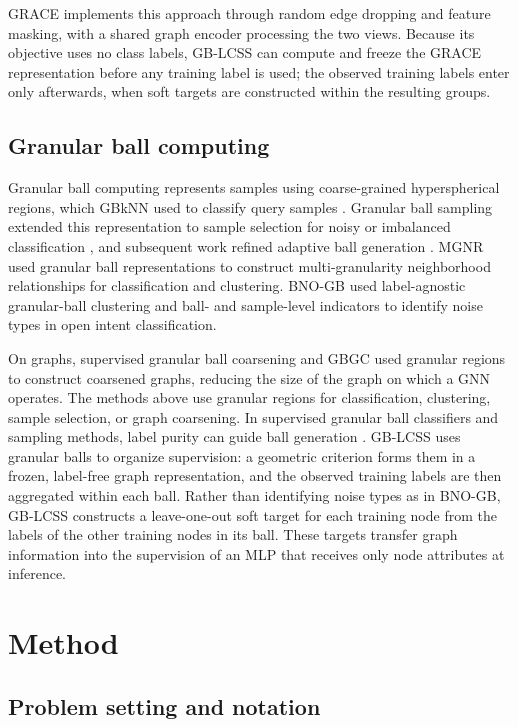 \documentclass[times,review,10pt]{elsarticle}
\theoremstyle{definition}
\theoremstyle{plain}
\begin{document}
GRACE \cite{ref12} implements this approach through random edge dropping and feature masking, with a shared graph encoder processing the two views. Because its objective uses no class labels, GB-LCSS can compute and freeze the GRACE representation before any training label is used; the observed training labels enter only afterwards, when soft targets are constructed within the resulting groups.

\subsection{Granular ball computing}\label{sec:2.5}

Granular ball computing represents samples using coarse-grained hyperspherical regions, which GBkNN used to classify query samples \cite{ref13}. Granular ball sampling extended this representation to sample selection for noisy or imbalanced classification \cite{ref15}, and subsequent work refined adaptive ball generation \cite{ref16}. MGNR \cite{ref58} used granular ball representations to construct multi-granularity neighborhood relationships for classification and clustering. BNO-GB \cite{pr2026bnogb} used label-agnostic granular-ball clustering and ball- and sample-level indicators to identify noise types in open intent classification.

On graphs, supervised granular ball coarsening \cite{ref66} and GBGC \cite{ref67} used granular regions to construct coarsened graphs, reducing the size of the graph on which a GNN operates. The methods above use granular regions for classification, clustering, sample selection, or graph coarsening. In supervised granular ball classifiers and sampling methods, label purity can guide ball generation \cite{ref13,ref15,ref16}. GB-LCSS uses granular balls to organize supervision: a geometric criterion forms them in a frozen, label-free graph representation, and the observed training labels are then aggregated within each ball. Rather than identifying noise types as in BNO-GB, GB-LCSS constructs a leave-one-out soft target for each training node from the labels of the other training nodes in its ball. These targets transfer graph information into the supervision of an MLP that receives only node attributes at inference.
\section{Method}\label{sec:3}

\subsection{Problem setting and notation}\label{sec:3.1}
\end{document}

